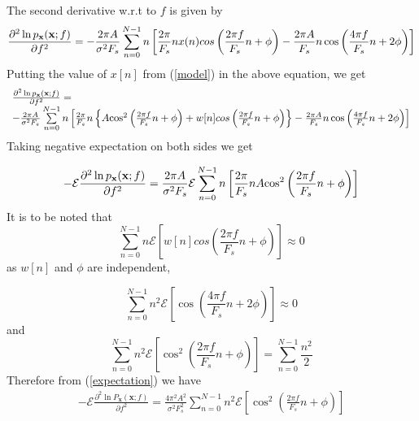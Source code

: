 The second derivative w.r.t to $f$ is given by
\begin{align}
	\frac{{{\partial ^2}\ln {p_{\bf{x}}}({\bf{x}};f)}}{{\partial
			{f^2}}} =  - \frac{{2\pi A}}{{{\sigma ^2}{F_s}}}\sum\limits_{n =
		0}^{N - 1} {n\left[ {\frac{{2\pi }}{{{F_s}}}nx(n)cos\left(
			{\frac{{2\pi f}}{{{F_s}}}n + \phi } \right) - \frac{{2\pi
					A}}{{{F_s}}}n\cos \left( {\frac{{4\pi f}}{{{F_s}}}n + 2\phi }
			\right)} \right]}
\end{align}
Putting the value of $x[n]$ from (\ref{model}) in the above
equation, we get
\begin{align}
	\begin{array}{l}
		\frac{{{\partial ^2}\ln {p_{\bf{x}}}({\bf{x}};f)}}{{\partial {f^2}}} = \\
		- \frac{{2\pi A}}{{{\sigma ^2}{F_s}}}\sum\limits_{n = 0}^{N - 1} {n\left[ {\frac{{2\pi }}{{{F_s}}}n\left\{ {A{{\cos }^2}\left( {\frac{{2\pi f}}{{{F_s}}}n + \phi } \right) + w[n]cos\left( {\frac{{2\pi f}}{{{F_s}}}n + \phi } \right)} \right\} - \frac{{2\pi A}}{{{F_s}}}n\cos \left( {\frac{{4\pi f}}{{{F_s}}}n + 2\phi } \right)} \right]}
	\end{array}
\end{align}
Taking negative expectation on both sides we get

\begin{align}
	\label{expectation} - \mathcal E\frac{{{\partial ^2}\ln
			{p_{\bf{x}}}({\bf{x}};f)}}{{\partial {f^2}}} = \frac{{2\pi
			A}}{{{\sigma ^2}{F_s}}} \mathcal E\sum\limits_{n = 0}^{N - 1} {n\left[
		{\frac{{2\pi }}{{{F_s}}}nA{{\cos }^2}\left( {\frac{{2\pi
						f}}{{{F_s}}}n + \phi } \right)} \right]}
\end{align}
It is to be noted that \[\sum\limits_{n = 0}^{N - 1} {n \mathcal E\left[
	{w[n]cos\left( {\frac{{2\pi f}}{{{F_s}}}n + \phi } \right)}
	\right]}  \approx 0\] as $w[n]$ and $\phi$ are independent,

\[\sum\limits_{n = 0}^{N - 1} {{n^2}\mathcal E\left[ {\cos \left( {\frac{{4\pi f}}{{{F_s}}}n + 2\phi } \right)} \right]}  \approx 0\] and \[\sum\limits_{n = 0}^{N - 1} {{n^2} \mathcal E\left[ {{{\cos }^2}\left( {\frac{{2\pi f}}{{{F_s}}}n + \phi } \right)} \right]}  = \sum\limits_{n = 0}^{N - 1} {\frac{{{n^2}}}{2}} \]
Therefore from (\ref{expectation}) we have
\begin{align*}
	- \mathcal E\frac{{{\partial ^2}\ln
			{P_{\mathbf{x}}}({\mathbf{x}};f)}}{{\partial {f^2}}} =
	\frac{{4{\pi ^2}{A^2}}}{{{\sigma ^2}F_s^2}}\sum\limits_{n = 0}^{N
		- 1} {{n^2} \mathcal E\left[ {{{\cos }^2}\left( {\frac{{2\pi f}}{{{F_s}}}n +
				\phi } \right)} \right]}
\end{align*}

